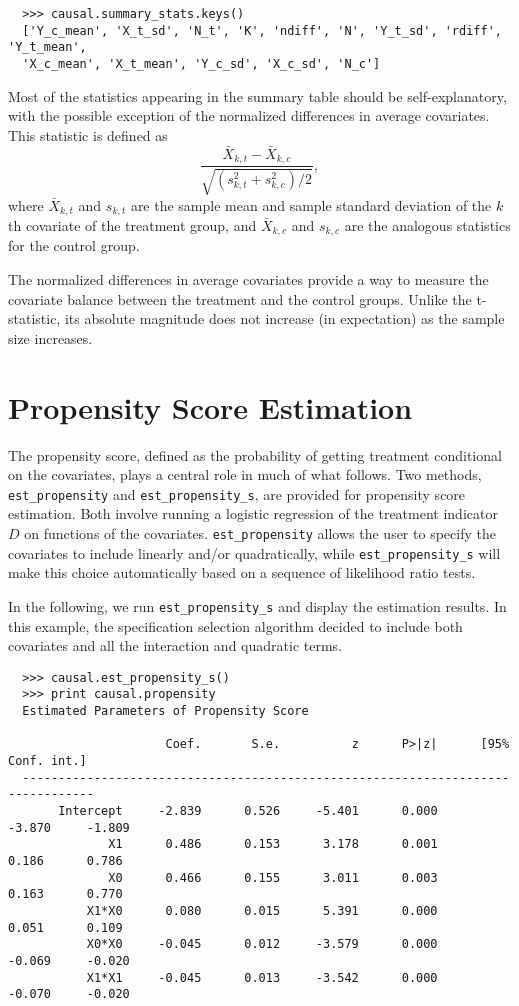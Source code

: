 \documentclass[12pt]{article}
\theoremstyle{definition}
\theoremstyle{definition}
\theoremstyle{definition}
\theoremstyle{remark}
\begin{document}
\begin{verbatim}
  >>> causal.summary_stats.keys()
  ['Y_c_mean', 'X_t_sd', 'N_t', 'K', 'ndiff', 'N', 'Y_t_sd', 'rdiff', 'Y_t_mean',
  'X_c_mean', 'X_t_mean', 'Y_c_sd', 'X_c_sd', 'N_c']
\end{verbatim}

Most of the statistics appearing in the summary table should be self-explanatory, with the possible exception of the normalized differences in average covariates. This statistic is defined as
\[\frac{\bar{X}_{k,t} - \bar{X}_{k,c}}{\sqrt{\left(s^2_{k,t}+s^2_{k,c}\right)\Big/ 2}},\]
where $\bar{X}_{k,t}$ and $s_{k,t}$ are the sample mean and sample standard deviation of the $k$th covariate of the treatment group, and $\bar{X}_{k,c}$ and $s_{k,c}$ are the analogous statistics for the control group.

The normalized differences in average covariates provide a way to measure the covariate balance between the treatment and the control groups. Unlike the t-statistic, its absolute magnitude does not increase (in expectation) as the sample size increases.

\section*{Propensity Score Estimation}

The propensity score, defined as the probability of getting treatment conditional on the covariates, plays a central role in much of what follows. Two methods, \texttt{est\_propensity} and \texttt{est\_propensity\_s}, are provided for propensity score estimation. Both involve running a logistic regression of the treatment indicator $D$ on functions of the covariates. \texttt{est\_propensity} allows the user to specify the covariates to include linearly and/or quadratically, while \texttt{est\_propensity\_s} will make this choice automatically based on a sequence of likelihood ratio tests.

In the following, we run \texttt{est\_propensity\_s} and display the estimation results. In this example, the specification selection algorithm decided to include both covariates and all the interaction and quadratic terms.

\begin{verbatim}
  >>> causal.est_propensity_s()
  >>> print causal.propensity
  Estimated Parameters of Propensity Score
  
                      Coef.       S.e.          z      P>|z|      [95% Conf. int.]
  --------------------------------------------------------------------------------
       Intercept     -2.839      0.526     -5.401      0.000     -3.870     -1.809
              X1      0.486      0.153      3.178      0.001      0.186      0.786
              X0      0.466      0.155      3.011      0.003      0.163      0.770
           X1*X0      0.080      0.015      5.391      0.000      0.051      0.109
           X0*X0     -0.045      0.012     -3.579      0.000     -0.069     -0.020
           X1*X1     -0.045      0.013     -3.542      0.000     -0.070     -0.020
\end{verbatim}
\end{document}
